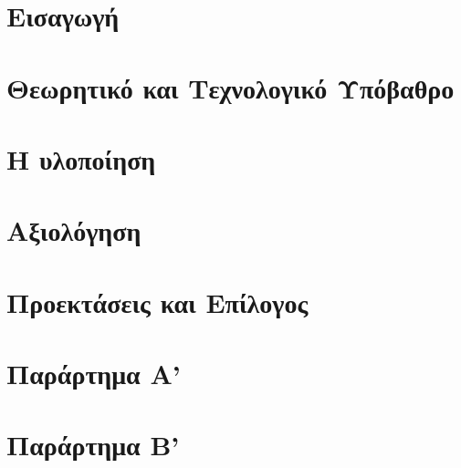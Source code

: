 \documentclass[a4paper,11pt,twoside]{book}
\author{\me}
\begin{document}
\setcounter{page}{3}



\clearemptydoublepage



\clearemptydoublepage



\clearemptydoublepage



\clearemptydoublepage



\clearemptydoublepage



\clearemptydoublepage

\pagestyle{fancy}

\tableofcontents
\clearemptydoublepage
\listoffigures
\clearemptydoublepage
\listoftables
\clearemptydoublepage


\setcounter{page}{1}

\mainmatter
\chapter{Εισαγωγή}\label{ch:introduction}

\clearemptydoublepage

\chapter{Θεωρητικό και Τεχνολογικό Υπόβαθρο}\label{ch:technicalAndTheoreticalBg}

\clearemptydoublepage

\chapter{Η υλοποίηση}\label{ch:implementation}

\clearemptydoublepage

\chapter{Αξιολόγηση}\label{ch:experiment}

\clearemptydoublepage

\chapter{Προεκτάσεις και Επίλογος}\label{ch:epilogue}

\clearemptydoublepage

\backmatter
 

% 
\clearemptydoublepage

\chapter{Παράρτημα Α'}

\clearemptydoublepage

\chapter{Παράρτημα Β'}

\clearemptydoublepage


\end{document}
